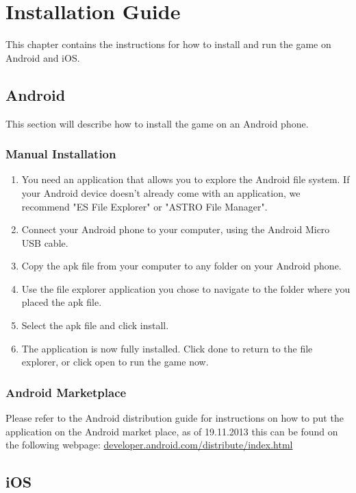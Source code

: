 \chapter{Installation Guide}

This chapter contains the instructions for how to install and run the game on 
Android and iOS.

\section{Android}

This section will describe how to install the game on an Android phone.

\subsection*{Manual Installation}
\begin{enumerate}

	\item{} You need an application that allows you to explore the Android file
	system. If your Android device doesn't already come with an application, 
	we recommend "ES File Explorer" or "ASTRO File Manager".

	\item{} Connect your Android phone to your computer, using the Android Micro
	USB cable.

	\item{} Copy the apk file from your computer to any folder on your Android 
	phone.

	\item{} Use the file explorer application you chose to navigate to the folder 
	where you placed the apk file.

	\item{} Select the apk file and click install.

	\item{} The application is now fully installed. Click done to return to the 
	file explorer, or click open to run the game now.

\end{enumerate}

\subsection*{Android Marketplace}
Please refer to the Android distribution guide for instructions on how to put 
the application on the Android market place, as of 19.11.2013 this can be found 
on the following webpage: \href{http://developer.android.com/distribute/index.h //
tml}{developer.android.com/distribute/index.html}

\section{iOS}
